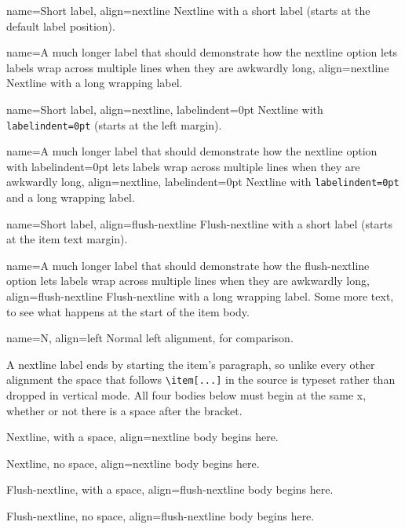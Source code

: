 \documentclass{article}
\begin{document}
\begin{prop}
  \item[name={Short label}, align=nextline]
    Nextline with a short label (starts at the default label position).
  \item[name={A much longer label that should demonstrate how the nextline
    option lets labels wrap across multiple lines when they are awkwardly
    long}, align=nextline]
    Nextline with a long wrapping label.
  \item[name={Short label}, align=nextline, labelindent=0pt]
    Nextline with \texttt{labelindent=0pt} (starts at the left margin).
  \item[name={A much longer label that should demonstrate how the nextline
    option with labelindent=0pt lets labels wrap across multiple lines when
    they are awkwardly long}, align=nextline, labelindent=0pt]
    Nextline with \texttt{labelindent=0pt} and a long wrapping label.
  \item[name={Short label}, align=flush-nextline]
    Flush-nextline with a short label (starts at the item text margin).
  \item[name={A much longer label that should demonstrate how the
    flush-nextline option lets labels wrap across multiple lines when they are
    awkwardly long}, align=flush-nextline]
    Flush-nextline with a long wrapping label.  Some more text, to see what
    happens at the start of the item body.
  \item[name={N}, align=left] Normal left alignment, for comparison.
\end{prop}

A nextline label ends by starting the item's paragraph, so unlike every other
alignment the space that follows \verb|\item[...]| in the source is typeset
rather than dropped in vertical mode.  All four bodies below must begin at the
same x, whether or not there is a space after the bracket.

\begin{prop}
  \item[{Nextline, with a space}, align=nextline] body begins here.
  \item[{Nextline, no space}, align=nextline]body begins here.
  \item[{Flush-nextline, with a space}, align=flush-nextline] body begins here.
  \item[{Flush-nextline, no space}, align=flush-nextline]body begins here.
\end{prop}
\end{document}
